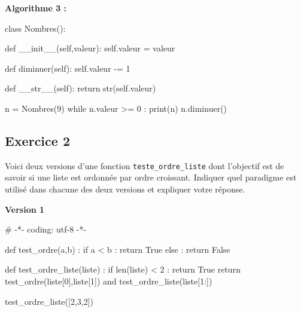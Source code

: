\documentclass[
  letterpaper,
  DIV=11,
  numbers=noendperiod]{scrartcl}
\newenvironment{Shaded}{\begin{snugshade}}{\end{snugshade}}
\newcommand{\BuiltInTok}[1]{\textcolor[rgb]{0.00,0.23,0.31}{#1}}
\newcommand{\CommentTok}[1]{\textcolor[rgb]{0.37,0.37,0.37}{#1}}
\newcommand{\ControlFlowTok}[1]{\textcolor[rgb]{0.00,0.23,0.31}{#1}}
\newcommand{\DecValTok}[1]{\textcolor[rgb]{0.68,0.00,0.00}{#1}}
\newcommand{\FunctionTok}[1]{\textcolor[rgb]{0.28,0.35,0.67}{#1}}
\newcommand{\KeywordTok}[1]{\textcolor[rgb]{0.00,0.23,0.31}{#1}}
\newcommand{\NormalTok}[1]{\textcolor[rgb]{0.00,0.23,0.31}{#1}}
\newcommand{\OperatorTok}[1]{\textcolor[rgb]{0.37,0.37,0.37}{#1}}
\newcommand{\VariableTok}[1]{\textcolor[rgb]{0.07,0.07,0.07}{#1}}
\begin{document}
\textbf{Algorithme 3 :}

\begin{Shaded}
\begin{Highlighting}[]
\KeywordTok{class}\NormalTok{ Nombres():}

    \KeywordTok{def} \FunctionTok{\_\_init\_\_}\NormalTok{(}\VariableTok{self}\NormalTok{,valeur):}
        \VariableTok{self}\NormalTok{.valeur }\OperatorTok{=}\NormalTok{ valeur}

    \KeywordTok{def}\NormalTok{ diminuer(}\VariableTok{self}\NormalTok{):}
        \VariableTok{self}\NormalTok{.valeur }\OperatorTok{{-}=} \DecValTok{1}

    \KeywordTok{def} \FunctionTok{\_\_str\_\_}\NormalTok{(}\VariableTok{self}\NormalTok{):}
        \ControlFlowTok{return} \BuiltInTok{str}\NormalTok{(}\VariableTok{self}\NormalTok{.valeur)}

\NormalTok{n }\OperatorTok{=}\NormalTok{ Nombres(}\DecValTok{9}\NormalTok{)}
\ControlFlowTok{while}\NormalTok{ n.valeur }\OperatorTok{\textgreater{}=} \DecValTok{0}\NormalTok{ :}
    \BuiltInTok{print}\NormalTok{(n)}
\NormalTok{    n.diminuer()}
\end{Highlighting}
\end{Shaded}

\hypertarget{fa-solid-pencil-alt-exercice-2}{%
\subsection{\texorpdfstring{ Exercice
2}{ Exercice 2}}\label{fa-solid-pencil-alt-exercice-2}}

Voici deux versions d'une fonction \texttt{teste\_ordre\_liste} dont
l'objectif est de savoir si une liste est ordonnée par ordre croissant.
Indiquer quel paradigme est utilisé dans chacune des deux versions et
expliquer votre réponse.

\textbf{Version 1}

\begin{Shaded}
\begin{Highlighting}[]
\CommentTok{\# {-}*{-} coding: utf{-}8 {-}*{-}}

\KeywordTok{def}\NormalTok{ test\_ordre(a,b) :}
    \ControlFlowTok{if}\NormalTok{ a }\OperatorTok{\textless{}}\NormalTok{ b :}
        \ControlFlowTok{return} \VariableTok{True}
    \ControlFlowTok{else}\NormalTok{ :}
        \ControlFlowTok{return} \VariableTok{False}

\KeywordTok{def}\NormalTok{ test\_ordre\_liste(liste) :}
    \ControlFlowTok{if} \BuiltInTok{len}\NormalTok{(liste) }\OperatorTok{\textless{}} \DecValTok{2}\NormalTok{ :}
        \ControlFlowTok{return} \VariableTok{True}
    \ControlFlowTok{return}\NormalTok{ test\_ordre(liste[}\DecValTok{0}\NormalTok{],liste[}\DecValTok{1}\NormalTok{]) }\KeywordTok{and}\NormalTok{ test\_ordre\_liste(liste[}\DecValTok{1}\NormalTok{:])}

\NormalTok{test\_ordre\_liste([}\DecValTok{2}\NormalTok{,}\DecValTok{3}\NormalTok{,}\DecValTok{2}\NormalTok{])}
\end{Highlighting}
\end{Shaded}
\end{document}

